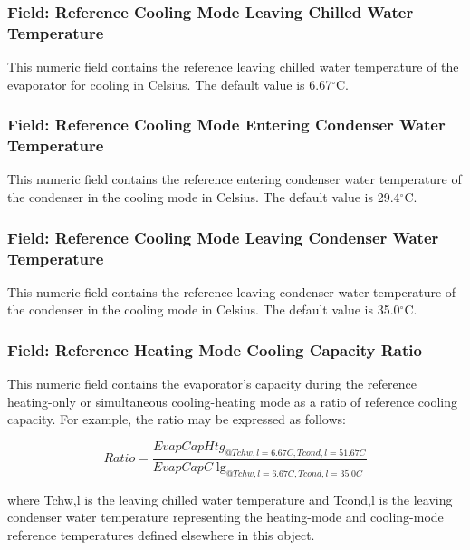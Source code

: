 \subsubsection{Field: Reference Cooling Mode Leaving Chilled Water Temperature}\label{field-reference-cooling-mode-leaving-chilled-water-temperature}

This numeric field contains the reference leaving chilled water temperature of the evaporator for cooling in Celsius. The default value is 6.67$^\circ$C.

\subsubsection{Field: Reference Cooling Mode Entering Condenser Water Temperature}\label{field-reference-cooling-mode-entering-condenser-water-temperature}

This numeric field contains the reference entering condenser water temperature of the condenser in the cooling mode in Celsius. The default value is 29.4$^\circ$C.

\subsubsection{Field: Reference Cooling Mode Leaving Condenser Water Temperature}\label{field-reference-cooling-mode-leaving-condenser-water-temperature}

This numeric field contains the reference leaving condenser water temperature of the condenser in the cooling mode in Celsius. The default value is 35.0$^\circ$C.

\subsubsection{Field: Reference Heating Mode Cooling Capacity Ratio}\label{field-reference-heating-mode-cooling-capacity-ratio}

This numeric field contains the evaporator's capacity during the reference heating-only or simultaneous cooling-heating mode as a ratio of reference cooling capacity. For example, the ratio may be expressed as follows:

\begin{equation}
    Ratio = \frac{{EvapCapHt{g_{@Tchw,l = 6.67C,Tcond,l = 51.67C}}}}{{EvapCapC{{\lg }_{@Tchw,l = 6.67C,Tcond,l = 35.0C}}}}
\end{equation}

where Tchw,l is the leaving chilled water temperature and Tcond,l is the leaving condenser water temperature representing the heating-mode and cooling-mode reference temperatures defined elsewhere in this object.

